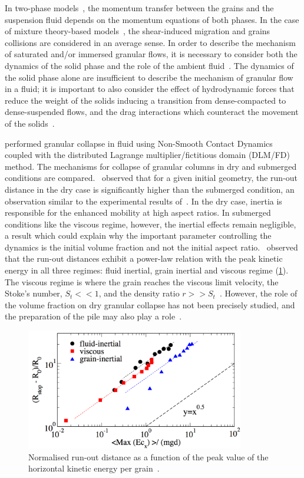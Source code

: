 In two-phase models~\citep{Pitman2005}, the momentum transfer between the 
grains and the suspension fluid depends on the momentum equations of both 
phases. In the case of mixture theory-based models~\citep{Meruane2010}, the 
shear-induced migration and grains collisions are considered in an average 
sense. In order to describe the mechanism of saturated and/or immersed granular 
flows, it is necessary to consider both the dynamics of the solid phase and the 
role of the ambient fluid~\citep{Denlinger2001,Iverson1997}. The dynamics of 
the solid phase alone are insufficient to describe the mechanism of granular 
flow in a fluid; it is important to also consider the effect of hydrodynamic 
forces that reduce the weight of the solids inducing a transition from 
dense-compacted to dense-suspended flows, and the drag interactions which 
counteract the movement of the solids~\citep{Meruane2010}.

\citet{Topin2011} performed granular collapse in fluid using Non-Smooth Contact 
Dynamics coupled with the distributed Lagrange multiplier/fictitious domain 
(DLM/FD) method. The mechanisms for collapse of granular columns in dry and 
submerged conditions are compared.~\citet{Topin2011} observed that for a given 
initial geometry, the run-out distance in the dry case is significantly higher 
than the submerged condition, an observation similar to the experimental 
results of~\citet{Cassar2005}. In the dry 
case, inertia is responsible for the enhanced mobility at high 
aspect ratios. In submerged conditions like the viscous regime, however, 
the 
inertial effects remain negligible, a result which could explain why the 
important parameter controlling the dynamics is the initial volume fraction and 
not the initial aspect ratio.~\citet{Topin2011} observed that the run-out 
distances exhibit a 
power-law relation with the peak kinetic energy in all three regimes: fluid 
inertial, grain inertial and viscous regime (\cref{fig:Ekx_Run}). The 
viscous 
regime is where the grain reaches the viscous limit velocity, the Stoke's 
number, $S_t << 1$, and the density ratio $r >> 
S_t$~\citep{CourrechDuPont2003}. 
However, the role of the volume fraction on dry granular collapse has not been 
precisely studied, and the preparation of the 
pile may also play a role~\citep{Daerr1999a}.

\begin{figure}[htbp]
\centering
\includegraphics[width=0.85\textwidth]{Ekx_Run}
\caption{Normalised run-out distance as a function of
the peak value of the horizontal kinetic energy per grain~\citep{Topin2011}.}
\label{fig:Ekx_Run}
\end{figure}


